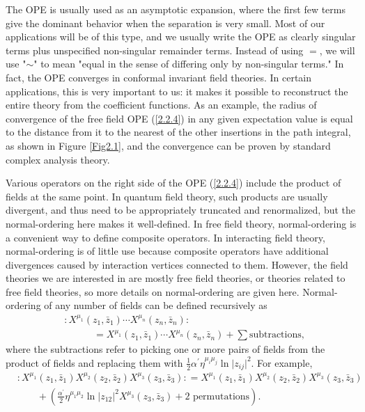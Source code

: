 The OPE is usually used as an asymptotic expansion, where the first few terms give the dominant behavior when the separation is very small. Most of our applications will be of this type, and we usually write the OPE as clearly singular terms plus unspecified non-singular remainder terms. Instead of using $=$, we will use "$\sim$" to mean "equal in the sense of differing only by non-singular terms." In fact, the OPE converges in conformal invariant field theories. In certain applications, this is very important to us: it makes it possible to reconstruct the entire theory from the coefficient functions.    
As an example, the radius of convergence of the free field OPE (\ref{2.2.4}) in any given expectation value is equal to the distance from it to the nearest of the other insertions in the path integral, as shown in Figure \ref{Fig2.1}, and the convergence can be proven by standard complex analysis theory.    

Various operators on the right side of the OPE (\ref{2.2.4}) include the product of fields at the same point. In quantum field theory, such products are usually divergent, and thus need to be appropriately truncated and renormalized, but the normal-ordering here makes it well-defined.    
In free field theory, normal-ordering is a convenient way to define composite operators. In interacting field theory, normal-ordering is of little use because composite operators have additional divergences caused by interaction vertices connected to them.    
However, the field theories we are interested in are mostly free field theories, or theories related to free field theories, so more details on normal-ordering are given here.    
Normal-ordering of any number of fields can be defined recursively as    
\begin{align}
	&: \mathrel{ X^{\mu_{1}}(z_{1}, \bar{z}_{1}) \cdots X^{\mu_{n}}(z_{n}, \bar{z}_{n})}: \nonumber \\
	&\qquad\quad =X^{\mu_{1}}(z_{1}, \bar{z}_{1}) \cdots X^{\mu_{n}}(z_{n}, \bar{z}_{n})+\sum \text{subtractions}, \label{2.2.5}
\end{align}
where the subtractions refer to picking one or more pairs of fields from the product of fields and replacing them with $\frac{1}{2} \alpha^{\prime} \eta^{\mu_{i} \mu_{j}} \ln \lvert z_{i j}\rvert^{2}$.    
For example,    
\begin{align}
	&:\mathrel{X^{\mu_{1}}(z_{1}, \bar{z}_{1}) X^{\mu_{2}}(z_{2}, \bar{z}_{2}) X^{\mu_{3}}(z_{3}, \bar{z}_{3})}: = 
	X^{\mu_{1}}(z_{1}, \bar{z}_{1}) X^{\mu_{2}}(z_{2}, \bar{z}_{2}) X^{\mu_{3}}(z_{3}, \bar{z}_{3}) \nonumber \\
	&\qquad+\left(\frac{\alpha^{\prime}}{2} \eta^{\mu_{1} \mu_{2}} \ln \lvert z_{12}\rvert^{2} X^{\mu_{3}}(z_{3}, \bar{z}_{3})+2 \text{ permutations}\right).
	\label{2.2.6}
\end{align}

